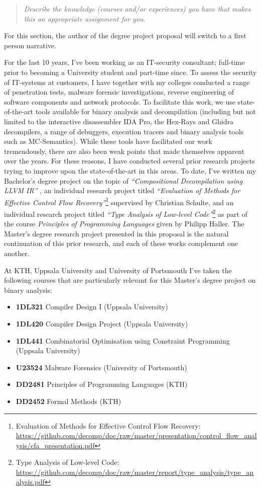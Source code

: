\documentclass[12pt, a4paper]{article}
\begin{document}
\begin{quote}
	\textit{Describe the knowledge (courses and/or experiences) you have that makes this an appropriate assignment for you.}
\end{quote}

For this section, the author of the degree project proposal will switch to a first person narrative.

For the last 10 years, I've been working as an IT-security consultant; full-time prior to becoming a University student and part-time since. To assess the security of IT-systems at customers, I have together with my colleges conducted a range of penetration tests, malware forensic investigations, reverse engineering of software components and network protocols. To facilitate this work, we use state-of-the-art tools available for binary analysis and decompilation (including but not limited to the interactive disassembler IDA Pro, the Hex-Rays and Ghidra decompilers, a range of debuggers, execution tracers and binary analysis tools such as MC-Semantics). While these tools have facilitated our work tremendously, there are also been weak points that made themselves apparent over the years. For these reasons, I have conducted several prior research projects trying to improve upon the state-of-the-art in this areas. To date, I've written my Bachelor's degree project on the topic of \textit{``Compositional Decompilation using LLVM IR''} \cite{compositional_decompilation}, an individual research project titled \textit{``Evaluation of Methods for Effective Control Flow Recovery''}\footnote{Evaluation of Methods for Effective Control Flow Recovery: \url{https://github.com/decomp/doc/raw/master/presentation/control_flow_analysis/cfa_presentation.pdf}} supervised by Christian Schulte, and an individual research project titled \textit{``Type Analysis of Low-level Code''}\footnote{Type Analysis of Low-level Code: \url{https://github.com/decomp/doc/raw/master/report/type_analysis/type_analysis.pdf}} as part of the course \textit{Principles of Programming Languages} given by Philipp Haller. The Master's degree research project presented in this proposal is the natural continuation of this prior research, and each of these works complement one another.

At KTH, Uppsala University and University of Portsmouth I've taken the following courses that are particularly relevant for this Master's degree project on binary analysis:

\begin{itemize}
	\item \textbf{1DL321} Compiler Design I (Uppsala University)
	\item \textbf{1DL420} Compiler Design Project (Uppsala University)
	\item \textbf{1DL441} Combinatorial Optimisation using Constraint Programming (Uppsala University)
	\item \textbf{U23524} Malware Forensics (University of Portsmouth)
	\item \textbf{DD2481} Principles of Programming Languages (KTH)
	\item \textbf{DD2452} Formal Methods (KTH)
\end{itemize}
\end{document}
